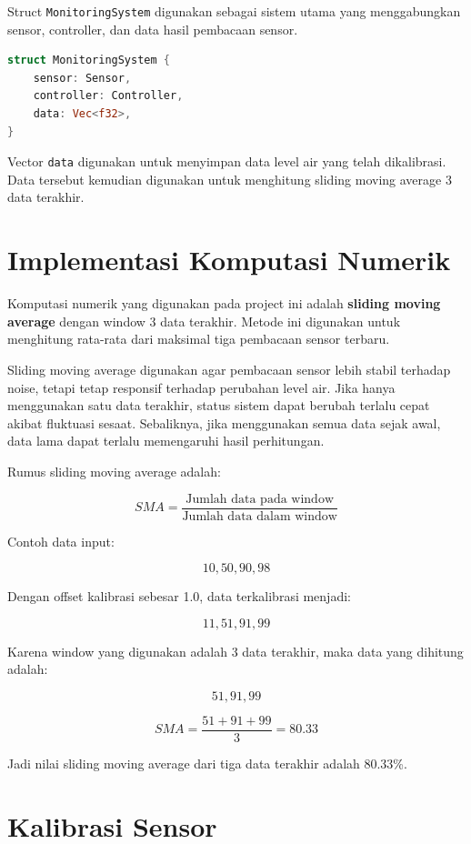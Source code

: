 \documentclass[12pt,a4paper]{article}
\begin{document}
Struct \texttt{MonitoringSystem} digunakan sebagai sistem utama yang menggabungkan sensor, controller, dan data hasil pembacaan sensor.

\begin{lstlisting}[language=Rust]
struct MonitoringSystem {
    sensor: Sensor,
    controller: Controller,
    data: Vec<f32>,
}
\end{lstlisting}

Vector \texttt{data} digunakan untuk menyimpan data level air yang telah dikalibrasi. Data tersebut kemudian digunakan untuk menghitung sliding moving average 3 data terakhir.

\section{Implementasi Komputasi Numerik}

Komputasi numerik yang digunakan pada project ini adalah \textbf{sliding moving average} dengan window 3 data terakhir. Metode ini digunakan untuk menghitung rata-rata dari maksimal tiga pembacaan sensor terbaru.

Sliding moving average digunakan agar pembacaan sensor lebih stabil terhadap noise, tetapi tetap responsif terhadap perubahan level air. Jika hanya menggunakan satu data terakhir, status sistem dapat berubah terlalu cepat akibat fluktuasi sesaat. Sebaliknya, jika menggunakan semua data sejak awal, data lama dapat terlalu memengaruhi hasil perhitungan.

Rumus sliding moving average adalah:

\[
SMA = \frac{\text{Jumlah data pada window}}{\text{Jumlah data dalam window}}
\]

Contoh data input:

\[
10, 50, 90, 98
\]

Dengan offset kalibrasi sebesar 1.0, data terkalibrasi menjadi:

\[
11, 51, 91, 99
\]

Karena window yang digunakan adalah 3 data terakhir, maka data yang dihitung adalah:

\[
51, 91, 99
\]

\[
SMA = \frac{51 + 91 + 99}{3} = 80.33
\]

Jadi nilai sliding moving average dari tiga data terakhir adalah 80.33\%.

\section{Kalibrasi Sensor}
\end{document}
